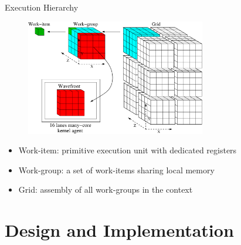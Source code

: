 \documentclass[handout]{beamer}
\begin{document}
\begin{CJK}{UTF8}{bkai}
            \begin{frame}{Execution Hierarchy}
                \begin{figure}[t] 
                    \centering
                    \includegraphics[width=0.7\textwidth]{./figs/grid.eps}
                    \label{fig:grid}
                \end{figure}%
                \begin{itemize}
                    \item <2-> {Work-item: primitive execution unit with dedicated registers}
                    \item <3-> {Work-group: a set of work-items sharing local memory}
                    \item <4-> {Grid: assembly of all work-groups in the context}
                \end{itemize}
            \end{frame}



            \section{Design and Implementation}


\end{CJK}
\end{document}
